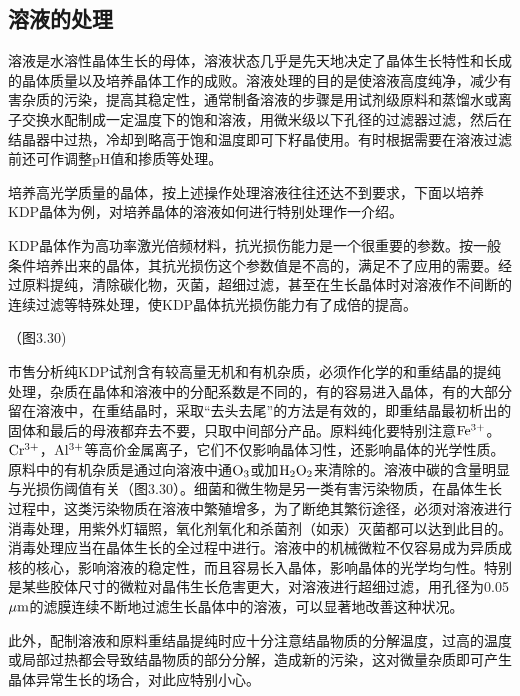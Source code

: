 \subsection{溶液的处理}
溶液是水溶性晶体生长的母体，溶液状态几乎是先天地决定了晶体生长特性和长成的晶体质量以及培养晶体工作的成败。溶液处理的目的是使溶液高度纯净，减少有害杂质的污染，提高其稳定性，通常制备溶液的步骤是用试剂级原料和蒸馏水或离子交换水配制成一定温度下的饱和溶液，用微米级以下孔径的过滤器过滤，然后在结晶器中过热，冷却到略高于饱和温度即可下籽晶使用。有时根据需要在溶液过滤前还可作调整pH值和掺质等处理。

培养高光学质量的晶体，按上述操作处理溶液往往还达不到要求，下面以培养KDP晶体为例，对培养晶体的溶液如何进行特别处理作一介绍。

KDP晶体作为高功率激光倍频材料，抗光损伤能力是一个很重要的参数。按一般条件培养出来的晶体，其抗光损伤这个参数值是不高的，满足不了应用的需要。经过原料提纯，清除碳化物，灭菌，超细过滤，甚至在生长晶体时对溶液作不间断的连续过滤等特殊处理，使KDP晶体抗光损伤能力有了成倍的提高。

（图3.30)

市售分析纯KDP试剂含有较高量无机和有机杂质，必须作化学的和重结晶的提纯处理，杂质在晶体和溶液中的分配系数是不同的，有的容易进入晶体，有的大部分留在溶液中，在重结晶时，采取“去头去尾”的方法是有效的，即重结晶最初析出的固体和最后的母液都弃去不要，只取中间部分产品。原料纯化要特别注意$\rm Fe^{3+}$。$\rm Cr^{3+}$，$\rm Al^{3+}$等高价金属离子，它们不仅影响晶体习性，还影响晶体的光学性质。原料中的有机杂质是通过向溶液中通$\rm O_3$或加$\rm H_2O_2$来清除的。溶液中碳的含量明显与光损伤阈值有关（图3.30）。细菌和微生物是另一类有害污染物质，在晶体生长过程中，这类污染物质在溶液中繁殖增多，为了断绝其繁衍途径，必须对溶液进行消毒处理，用紫外灯辐照，氧化剂氧化和杀菌剂（如汞）灭菌都可以达到此目的。消毒处理应当在晶体生长的全过程中进行。溶液中的机械微粒不仅容易成为异质成核的核心，影响溶液的稳定性，而且容易长入晶体，影响晶体的光学均匀性。特别是某些胶体尺寸的微粒对晶伟生长危害更大，对溶液进行超细过滤，用孔径为0.05$\rm\mu m$的滤膜连续不断地过滤生长晶体中的溶液，可以显著地改善这种状况。

此外，配制溶液和原料重结晶提纯时应十分注意结晶物质的分解温度，过高的温度或局部过热都会导致结晶物质的部分分解，造成新的污染，这对微量杂质即可产生晶体异常生长的场合，对此应特别小心。
